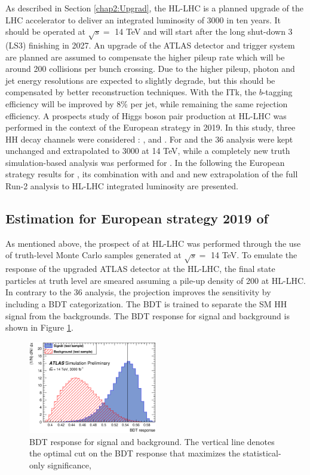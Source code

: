 As described in Section \ref{chap2:Upgrad}, the HL-LHC is a planned upgrade of the LHC accelerator to deliver an integrated luminosity of 3000 \ifb in ten years. It should be operated at $\sqrt{s} = $ 14 TeV and will start after the long shut-down 3 (LS3) finishing in 2027. An upgrade of the ATLAS detector and trigger system are planned are assumed to compensate the higher pileup rate which will be around 200 collisions per bunch crossing. Due to the higher pileup, photon and jet energy resolutions are expected to slightly degrade, but this should be compensated by better reconstruction techniques. With the ITk, the $b$-tagging efficiency will be improved by 8\% per jet, while remaining the same rejection efficiency. A prospects study of Higgs boson pair production at HL-LHC was performed in the context of the European strategy in 2019. In this study, three HH decay channels were considered : \bbbb, \bbtt and \bbyy. For \bbbb and \bbtt the 36 \ifb analysis were kept unchanged and extrapolated to 3000 \ifb at 14 TeV, while a completely new truth simulation-based analysis was performed for \bbyy. In the following the European strategy results for \HHyybb, its combination with \bbbb and \bbtt and new extrapolation of the full Run-2 \HHyybb analysis to HL-LHC integrated luminosity are presented.

\subsection{Estimation for European strategy 2019 of \bbyy}
As mentioned above, the prospect of \HHyybb at HL-LHC was performed through the use of truth-level Monte Carlo samples generated at $\sqrt{s} = $ 14 TeV. To emulate the response of the upgraded ATLAS detector at the HL-LHC, the final state particles at truth level are smeared assuming a pile-up density of 200 at HL-LHC. In contrary to the 36 \ifb analysis, the projection improves the sensitivity by including a BDT categorization. The BDT is trained to separate the SM HH signal from the backgrounds. The BDT response for signal and background is shown in Figure \ref{fig:HL-LHC:36ifb:BDT}. 

\begin{figure}[htbp]
    \centering
    \includegraphics[width=0.5\textwidth]{Ch6/Img/figures_bbyy_overtrainTestOnly.eps}
    \caption{BDT response for signal and background. The vertical line denotes the optimal cut on the BDT response that maximizes the statistical-only significance,}
    \label{fig:HL-LHC:36ifb:BDT}
\end{figure}

